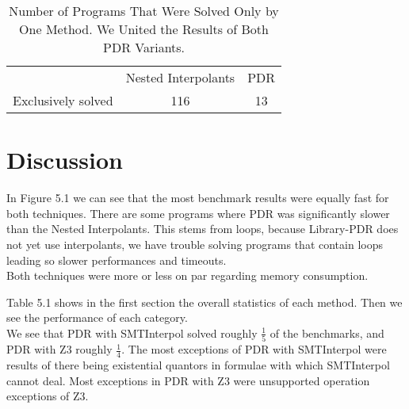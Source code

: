 \documentclass[11pt, a4paper, BCOR=10mm, ngerman]{scrbook}
\begin{document}
\vspace*{3cm}

\begin{table}

\begin{center}
	\begin{tabu}{ccc}
		\toprule
		\cmidrule(lr){1-3}
		& Nested Interpolants & PDR \\
		Exclusively solved & 116 & 13 \\
		\bottomrule
	\end{tabu}
\caption{Number of Programs That Were Solved Only by One Method. We United the Results of Both PDR Variants.}
\end{center}
\end{table}

\vspace{2cm}


\section{Discussion}
In Figure 5.1 we can see that the most benchmark results were equally fast for both techniques. There are some programs where PDR was significantly slower than the Nested Interpolants. This stems from loops, because Library-PDR does not yet use interpolants, we have trouble solving programs that contain loops leading so slower performances and timeouts. \\
Both techniques were more or less on par regarding memory consumption. \par
Table 5.1 shows in the first section the overall statistics of each method. Then we see the performance of each category. \\
We see that PDR with SMTInterpol solved roughly $\frac{1}{5}$ of the benchmarks, and PDR with Z3 roughly $\frac{1}{4}$. The most exceptions of PDR with SMTInterpol were results of there being existential quantors in formulae with which SMTInterpol cannot deal. Most exceptions in PDR with Z3 were unsupported operation exceptions of Z3. \par
\end{document}
